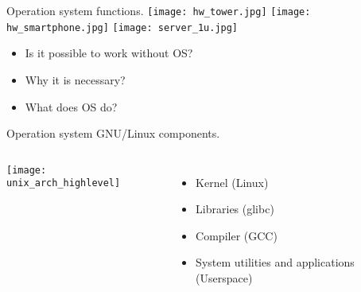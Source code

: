 \begin{frame}{Operation system functions.}
\texttt{[image: hw\_tower.jpg]} 
\texttt{[image: hw\_smartphone.jpg]}
\texttt{[image: server\_1u.jpg]}
	\begin{itemize}
            \item Is it possible to work without OS?
            \item Why it is necessary?
	    \item What does OS do?
	\end{itemize}
\end{frame}

\begin{frame}{Operation system GNU/Linux components.}
    \begin{columns}
    \texttt{[image: unix\_arch\_highlevel]}
	\begin{itemize}
		\item Kernel (Linux)
		\item Libraries (glibc)
                \item Compiler (GCC) 
		\item System utilities and applications (Userspace)
	\end{itemize}
    \end{columns}
\end{frame}
